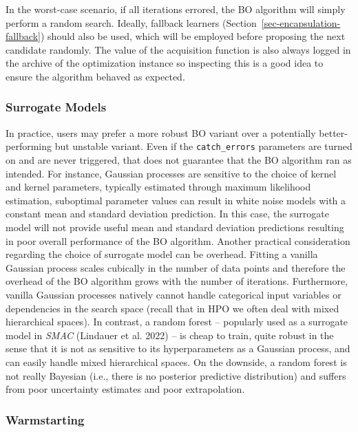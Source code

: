 In the worst-case scenario, if all iterations errored, the BO algorithm
will simply perform a random search. Ideally, fallback learners
(Section~\ref{sec-encapsulation-fallback}) should also be used, which
will be employed before proposing the next candidate randomly. The value
of the acquisition function is also always logged in the archive of the
optimization instance so inspecting this is a good idea to ensure the
algorithm behaved as expected.

\hypertarget{surrogate-models}{%
\subsubsection*{Surrogate Models}\label{surrogate-models}}

In practice, users may prefer a more robust BO variant over a
potentially better-performing but unstable variant. Even if the
\texttt{catch\_errors} parameters are turned on and are never triggered,
that does not guarantee that the BO algorithm ran as intended. For
instance, Gaussian processes are sensitive to the choice of kernel and
kernel parameters, typically estimated through maximum likelihood
estimation, suboptimal parameter values can result in white noise models
with a constant mean and standard deviation prediction. In this case,
the surrogate model will not provide useful mean and standard deviation
predictions resulting in poor overall performance of the BO algorithm.
Another practical consideration regarding the choice of surrogate model
can be overhead. Fitting a vanilla Gaussian process scales cubically in
the number of data points and therefore the overhead of the BO algorithm
grows with the number of iterations. Furthermore, vanilla Gaussian
processes natively cannot handle categorical input variables or
dependencies in the search space (recall that in HPO we often deal with
mixed hierarchical spaces). In contrast, a random forest -- popularly
used as a surrogate model in \emph{SMAC} (Lindauer et al. 2022) -- is
cheap to train, quite robust in the sense that it is not as sensitive to
its hyperparameters as a Gaussian process, and can easily handle mixed
hierarchical spaces. On the downside, a random forest is not really
Bayesian (i.e., there is no posterior predictive distribution) and
suffers from poor uncertainty estimates and poor extrapolation.

\hypertarget{warmstarting}{%
\subsubsection*{Warmstarting}\label{warmstarting}}

